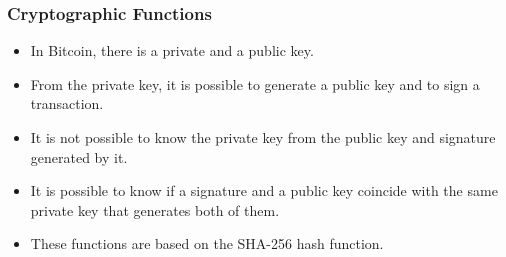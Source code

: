 \documentclass{beamer}
\begin{document}
\begin{frame}
  \frametitle{Cryptographic Functions}
  \begin{itemize}[<+->]
    \item In Bitcoin, there is a private and a public key.
    \item From the private key, it is possible to generate a public key
 and to sign a transaction.
    \item It is not possible to know the private key from the public key and signature generated by it.
    \item It is possible to know if a signature and a public key coincide with the same private key that generates both of them.
    \item These functions are based on the SHA-256 hash function.
  \end{itemize}
\end{frame}

\end{document}
